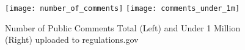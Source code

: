 \documentclass{article}
\begin{document}
\begin{figure}[hb]
\centering
\caption{Number of Public Comments Total (Left) and Under 1 Million (Right) uploaded to regulations.gov%
}
 \texttt{[image: number\_of\_comments]}
 \texttt{[image: comments\_under\_1m]}
\label{fig:comments}
\end{figure}

 





\end{document}
